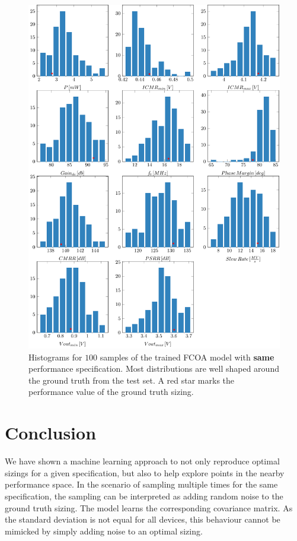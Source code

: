 \documentclass[conference]{IEEEtran}
\begin{document}
	\begin{figure}[]
		\centering
		\includegraphics[width=\linewidth]{figures/histograms_simple53_100samples}
		\caption{Histograms for $100$ samples of the trained FCOA model with \textbf{same} performance specification. Most distributions are well shaped around the ground truth from the test set. A red star marks the performance value of the ground truth sizing.}
		\label{fig:histograms53}
	\end{figure}
	
	
\section{Conclusion}
	We have shown a machine learning approach to not only reproduce optimal sizings for a given specification, but also to help explore points in the nearby performance space. In the scenario of sampling multiple times for the same specification, the sampling can be interpreted as adding random noise to the ground truth sizing. The model learns the corresponding covariance matrix. As the standard deviation is not equal for all devices, this behaviour cannot be mimicked by simply adding noise to an optimal sizing.



\end{document}
